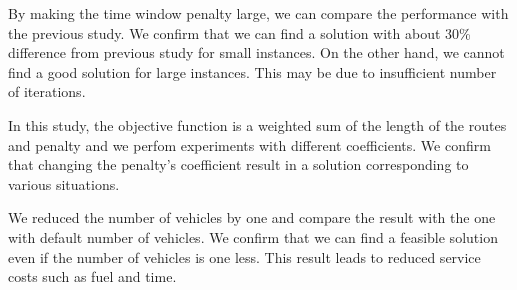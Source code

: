 By making the time window penalty large, we can compare the performance with the previous study. We confirm that we can find a solution with about 30\% difference from previous study for small instances. On the other hand, we cannot find a good solution for large instances. This may be due to insufficient number of iterations.

In this study, the objective function is a weighted sum of the length of the routes and penalty and we perfom experiments with different coefficients.
We confirm that changing the penalty's coefficient result in a solution corresponding to various situations.

We reduced the number of vehicles by one and compare the result with the one with default number of vehicles. We confirm that we can find a feasible solution even if the number of vehicles is one less.
This result leads to reduced service costs such as fuel and time.
